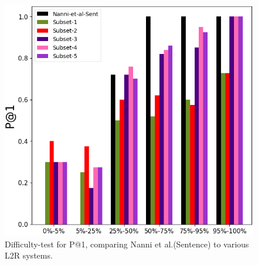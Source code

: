 \begin{figure}[t]
    \centering
    \includegraphics [width=1\columnwidth]{plot-cropped.png}
    \caption{Difficulty-test for P@1, comparing Nanni et al.(Sentence) to various L2R systems.}
    \label{fig:difficulty-plot}
\end{figure}













